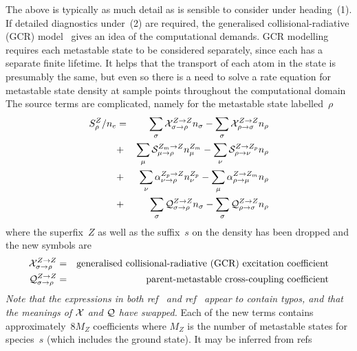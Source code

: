 The above is typically as much detail as is sensible to consider under heading~(1).
If detailed diagnostics under~(2) are required, the  generalised collisional-radiative (GCR) model~\cite{Ba03Diel}
gives an idea of the computational demands.
GCR modelling requires each metastable state to be considered separately, since each has a separate finite lifetime.
It helps that the transport of each atom in the state is presumably the same, but even so there is a need to
solve a rate equation for metastable state density at sample points throughout the computational domain
The source terms are complicated, namely for the metastable state labelled~$\rho$
\begin{eqnarray} \label{eq:nrhosource}
S^Z_\rho/n_e&=&\sum_\sigma \mathcal{X}_{\sigma \rightarrow \rho}^{Z\rightarrow Z}n_\sigma
-\sum_\sigma \mathcal{X}_{\rho \rightarrow \sigma}^{Z\rightarrow Z}n_\rho \\
&+&\sum_\mu \mathcal{S}_{\mu \rightarrow \rho}^{Z_m\rightarrow Z}n^{Z_m}_\mu
-\sum_\nu \mathcal{S}_{\rho \rightarrow \nu}^{Z\rightarrow Z_p}n_\rho  \\
&+&\sum_\nu \alpha_{\nu \rightarrow \rho}^{Z_p\rightarrow Z}n^{Z_p}_\nu
-\sum_\mu \alpha_{\rho \rightarrow \mu}^{Z\rightarrow Z_m}n_\rho \\
&+&\sum_\sigma \mathcal{Q}_{\sigma \rightarrow \rho}^{Z\rightarrow Z}n_\sigma
-\sum_\sigma \mathcal{Q}_{\rho \rightarrow \sigma}^{Z\rightarrow Z}n_\rho 
\end{eqnarray}
where the superfix~$Z$ as well as the suffix~$s$ on the density has been dropped
and the new symbols are
\begin{eqnarray}
\mathcal{X}_{\sigma \rightarrow \rho}^{Z\rightarrow Z} &=&\mbox{generalised collisional-radiative (GCR) excitation coefficient} \\
\mathcal{Q}_{\sigma \rightarrow \rho}^{Z\rightarrow Z} &=&\mbox{parent-metastable cross-coupling coefficient}
\end{eqnarray}
\emph{Note that the expressions in both ref~\cite[eq.\ (9)]{Ba03Diel} and ref~\cite[slide 41]{omullane}
appear to contain typos, and that the meanings of $\mathcal{X}$ and $\mathcal{Q}$ have swapped.}
Each of the new terms contains approximately~$8M_Z$ coefficients where $M_Z$ is the number of metastable
states for species~$s$ (which includes the ground state). It may be inferred from refs~\cite{omullane,Su06ADAS}
